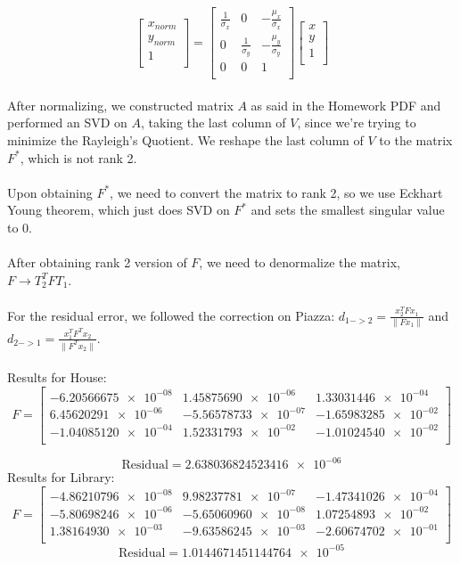 \documentclass{article}\usepackage{amsmath,amssymb,amsthm,tikz,tkz-graph,color,chngpage,soul,hyperref,csquotes,graphicx,floatrow}\newcommand*{\QEDB}{\hfill\ensuremath{\square}}\newtheorem*{prop}{Proposition}\renewcommand{\theenumi}{\alph{enumi}}\usepackage[shortlabels]{enumitem}\usepackage[nobreak=true]{mdframed}\usetikzlibrary{matrix,calc}\MakeOuterQuote{"}\usepackage[margin=0.95in]{geometry} \newtheorem{theorem}{Theorem}
\begin{document}
\begin{mdframed}
\[ 
\begin{bmatrix}
    x_{norm} \\
    y_{norm} \\
    1 \\
  \end{bmatrix}
  =
\begin{bmatrix}
    \frac{1}{\sigma_{x}} & 0 & -\frac{\mu_{x}}{\sigma_{x}} \\
    0 & \frac{1}{\sigma_{y}} & -\frac{\mu_{y}}{\sigma_{y}} \\
    0 & 0 & 1 \\
\end{bmatrix}
\begin{bmatrix}
    x \\
    y \\
    1 \\
\end{bmatrix}
\]
\\After normalizing, we constructed matrix $ A $ as said in the Homework PDF and performed an SVD on $ A $, taking the last column of $ V $, since we're trying to minimize the Rayleigh's Quotient. We reshape the last column of $ V $ to the matrix $ F^* $, which is not rank 2.\\\\ Upon obtaining $ F^* $, we need to convert the matrix to rank 2, so we use Eckhart Young theorem, which just does SVD on $ F^* $ and sets the smallest singular value to 0. \\\\  After obtaining rank 2 version of $ F $, we need to denormalize the matrix, $ F \rightarrow T^{T}_{2}FT_{1} $. \\\\ For the residual error, we followed the correction on Piazza: $ d_{1->2} = \frac{x_2^TFx_1}{\|Fx_1\|} $ and $d_{2->1} = \frac{x_1^TF^Tx_2}{\|F^Tx_2\|}$. \\\\ Results for House:
\[ F = 
\begin{bmatrix}
 \num{-6.20566675e-08} & \num{1.45875690e-06} & \num{1.33031446e-04} \\
 \num{6.45620291e-06} & \num{-5.56578733e-07} & \num{-1.65983285e-02} \\
 \num{-1.04085120e-04} & \num{1.52331793e-02} & \num{-1.01024540e-02} \\
\end{bmatrix}
\]

\[ \text{Residual}= \num{2.638036824523416e-06} \]
Results for Library:
\[ F = 
\begin{bmatrix}
 \num{-4.86210796e-08} & \num{9.98237781e-07} & \num{-1.47341026e-04} \\
 \num{-5.80698246e-06} & \num{-5.65060960e-08} & \num{1.07254893e-02} \\
 \num{1.38164930e-03} & \num{-9.63586245e-03} & \num{-2.60674702e-01} \\
\end{bmatrix}
\]
\[ \text{Residual}= \num{1.0144671451144764e-05} \]

\end{mdframed}
\end{document}
